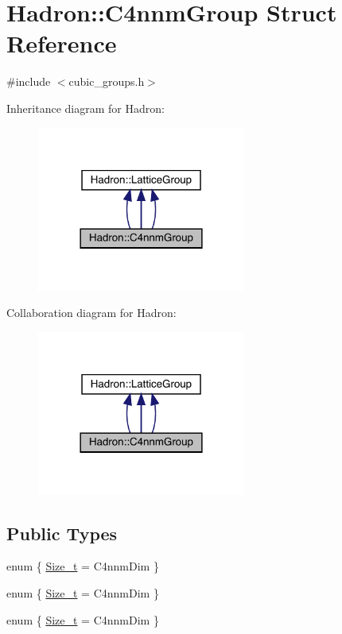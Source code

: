 \hypertarget{structHadron_1_1C4nnmGroup}{}\section{Hadron\+:\+:C4nnm\+Group Struct Reference}
\label{structHadron_1_1C4nnmGroup}


{\ttfamily \#include $<$cubic\+\_\+groups.\+h$>$}



Inheritance diagram for Hadron\+:
\nopagebreak
\begin{figure}[H]
\begin{center}
\leavevmode
\includegraphics[width=194pt]{d9/d35/structHadron_1_1C4nnmGroup__inherit__graph}
\end{center}
\end{figure}


Collaboration diagram for Hadron\+:
\nopagebreak
\begin{figure}[H]
\begin{center}
\leavevmode
\includegraphics[width=194pt]{dd/d70/structHadron_1_1C4nnmGroup__coll__graph}
\end{center}
\end{figure}
\subsection*{Public Types}
\begin{DoxyCompactItemize}
\item 
enum \{ \mbox{\hyperlink{structHadron_1_1C4nnmGroup_a40375fa9b957b23171ace431db1317fba527688d454fbcf487d428a6e00eb561f}{Size\+\_\+t}} = C4nnm\+Dim
 \}
\item 
enum \{ \mbox{\hyperlink{structHadron_1_1C4nnmGroup_a40375fa9b957b23171ace431db1317fba527688d454fbcf487d428a6e00eb561f}{Size\+\_\+t}} = C4nnm\+Dim
 \}
\item 
enum \{ \mbox{\hyperlink{structHadron_1_1C4nnmGroup_a40375fa9b957b23171ace431db1317fba527688d454fbcf487d428a6e00eb561f}{Size\+\_\+t}} = C4nnm\+Dim
 \}
\end{DoxyCompactItemize}
